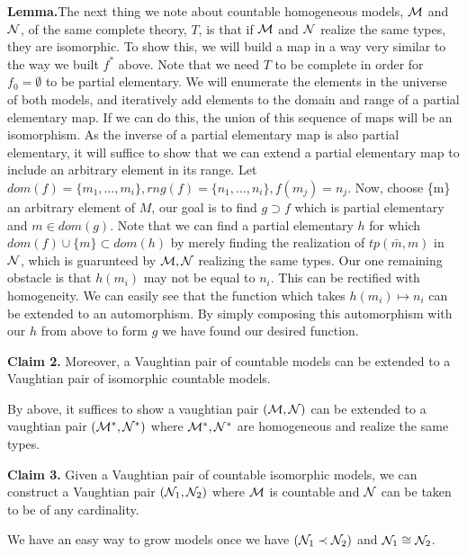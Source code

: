 \textbf{Lemma.}The next thing we note about countable homogeneous models, \(\mathcal{M}\) and \(\mathcal{N}\), of the same complete theory, \(T\), is that if \(\mathcal{M}\) and \(\mathcal{N}\) realize the same types, they are isomorphic.
To show this, we will build a map in a way very similar to the way we built \(f^*\) above. 
Note that we need \(T\) to be complete in order for \(f_0=\emptyset\) to be partial elementary.
We will enumerate the elements in the universe of both models, and iteratively add elements to the domain and range of a partial elementary map. 
If we can do this, the union of this sequence of maps will be an isomorphism.
As the inverse of a partial elementary map is also partial elementary, it will suffice to show that we can extend a partial elementary map to include an arbitrary element in its range. 
Let \(dom(f) = \{m_1, \ldots, m_i\}, rng(f) = \{n_1, \ldots, n_i\}, f(m_j) = n_j\).
Now, choose \{m\} an arbitrary element of \(M\), our goal is to find \(g \supset f\) which is partial elementary and \(m \in dom(g)\).
Note that we can find a partial elementary \(h\) for which \(dom(f) \cup \{m\} \subset dom(h)\) by merely finding the realization of \(tp(\bar{m}, m)\) in \(\mathcal{N}\), which is guarunteed by \(\mathcal{M}, \mathcal{N}\) realizing the same types. 
Our one remaining obstacle is that \(h(m_i)\) may not be equal to \(n_i\). 
This can be rectified with homogeneity. We can easily see that the function which takes \(h(m_i) \mapsto n_i\) can be extended to an automorphism. 
By simply composing this automorphism with our \(h\) from above to form \(g\) we have found our desired function. 


\textbf{Claim 2.} Moreover, a Vaughtian pair of countable models can be extended to a Vaughtian pair of isomorphic countable models.

By above, it suffices to show a vaughtian pair \((\mathcal{M}, \mathcal{N})\) can be extended to a vaughtian pair \((\mathcal{M}^*, \mathcal{N}^*)\) where \(\mathcal{M}^*, \mathcal{N}^*\) are homogeneous and realize the same types. 


\textbf{Claim 3.} Given a Vaughtian pair of countable isomorphic models, we can construct a Vaughtian pair \((\mathcal{N}_1, \mathcal{N}_2)\) where \(\mathcal{M}\) is countable and \(\mathcal{N}\) can be taken to be of any cardinality. %

We have an easy way to grow models once we have \((\mathcal{N}_1 \prec \mathcal{N}_2)\) and \(\mathcal{N}_1 \cong \mathcal{N}_2\). 

